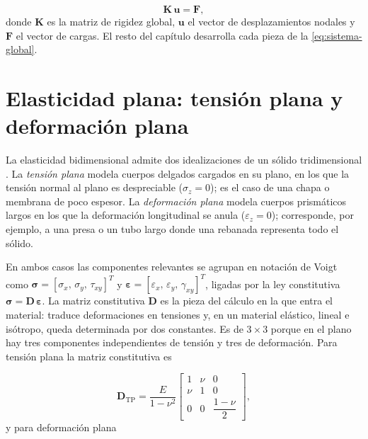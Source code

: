 \begin{equation}
\bm{K}\,\bm{u} = \bm{F},
\label{eq:sistema-global}
\end{equation}
donde $\bm{K}$ es la matriz de rigidez global, $\bm{u}$ el vector de desplazamientos nodales y $\bm{F}$ el vector de cargas. El resto del capítulo desarrolla cada pieza de la \autoref{eq:sistema-global}.

\section{Elasticidad plana: tensión plana y deformación plana}
\label{sec:elasticidad-plana}

La elasticidad bidimensional admite dos idealizaciones de un sólido tridimensional \autocites[pp.~11-12]{timoshenko1970elasticity}[pp.~79, 94]{cook2002concepts}. La \emph{tensión plana} modela cuerpos delgados cargados en su plano, en los que la tensión normal al plano es despreciable ($\sigma_z = 0$); es el caso de una chapa o membrana de poco espesor. La \emph{deformación plana} modela cuerpos prismáticos largos en los que la deformación longitudinal se anula ($\varepsilon_z = 0$); corresponde, por ejemplo, a una presa o un tubo largo donde una rebanada representa todo el sólido.

En ambos casos las componentes relevantes se agrupan en notación de Voigt como $\bm{\sigma} = [\sigma_x,\, \sigma_y,\, \tau_{xy}]^T$ y $\bm{\varepsilon} = [\varepsilon_x,\, \varepsilon_y,\, \gamma_{xy}]^T$, ligadas por la ley constitutiva $\bm{\sigma} = \bm{D}\,\bm{\varepsilon}$. La matriz constitutiva $\bm{D}$ es la pieza del cálculo en la que entra el material: traduce deformaciones en tensiones y, en un material elástico, lineal e isótropo, queda determinada por dos constantes. Es de $3\times3$ porque en el plano hay tres componentes independientes de tensión y tres de deformación. Para tensión plana la matriz constitutiva es

\begin{equation}
\bm{D}_{\text{TP}} = \frac{E}{1-\nu^{2}}
\begin{bmatrix}
1 & \nu & 0 \\
\nu & 1 & 0 \\
0 & 0 & \dfrac{1-\nu}{2}
\end{bmatrix},
\label{eq:D-tension-plana}
\end{equation}
y para deformación plana

